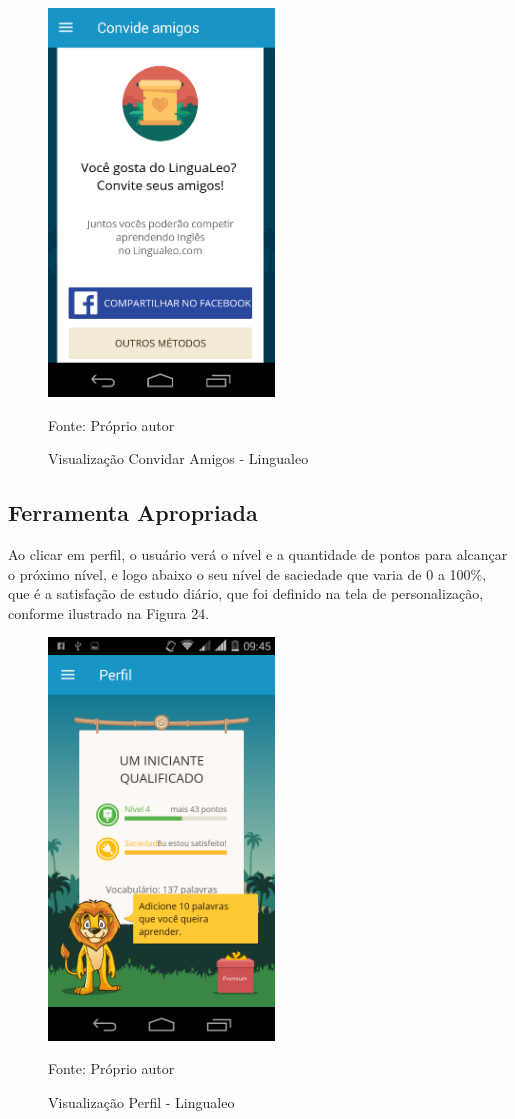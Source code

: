 \documentclass[
	12pt,				%
	openany,			%
	oneside,			%
	a4paper,			%
	english,			%
	french,				%
	spanish,			%
	brazil				%
	]{abntex2}
\begin{document}
\begin{figure}[H]
    \centering
\caption{Visualização Convidar Amigos - Lingualeo}
\includegraphics[width=6cm]{figuras/amigoslingualeo.png}
\par
 Fonte: Próprio autor
\end{figure}

\subsection{Ferramenta Apropriada}
	Ao clicar em perfil, o usuário verá o nível e a quantidade de pontos para alcançar o próximo nível, e logo abaixo o seu nível de saciedade que varia de 0 a 100\%, que é a satisfação de estudo diário, que foi definido na tela de personalização, conforme ilustrado na Figura 24.

\begin{figure}[H]
    \centering
\caption{Visualização Perfil - Lingualeo}
\includegraphics[width=6cm]{figuras/perfillingualeo.png}
\par
 Fonte: Próprio autor
\end{figure}
\end{document}

